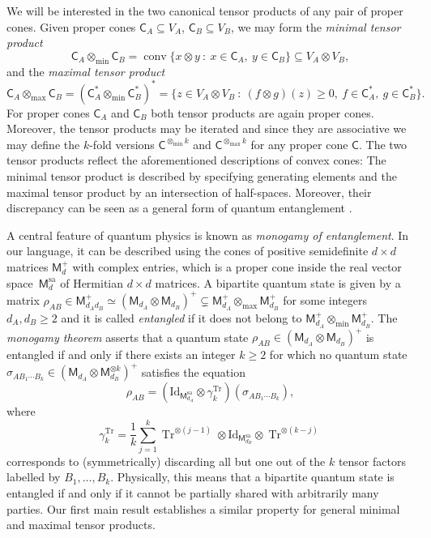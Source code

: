 \documentclass{amsart}
\renewcommand{\geq}{\geqslant}
\renewcommand{\subset}{\subseteq}
\newcommand{\gC}{\mathsf{C}}
\DeclareMathOperator{\conv}{\mathrm{conv}}
\newcommand{\M}{\mathsf{M}}
\newcommand{\Id}{\mathrm{Id}}
\def\lb{\left(}
\def\rb{\right)}
\def\lset{\lbrace}
\def\rset{\rbrace}
\DeclareMathOperator{\Tr}{Tr}
\theoremstyle{plain}
\newcommand{\tmin}{{\otimes_{\min}}}
\newcommand{\tmax}{{\otimes_{\max}}}
\begin{document}
We will be interested in the two canonical tensor products of any pair of proper cones. Given proper cones $\gC_A\subset V_A$, $\gC_B\subset V_B$, we may form the \emph{minimal tensor product}
\[
\gC_A \tmin \gC_B = \conv\lset x\otimes y~:~x\in \gC_A,\ y\in \gC_B\rset\subset V_A\otimes V_B ,
\]
and the \emph{maximal tensor product} 
\[
\gC_A \tmax \gC_B = (\gC^*_A\tmin \gC^*_B)^* = \lset z\in V_A\otimes V_B~:~ (f\otimes g)(z)\geq 0,\ f\in \gC_A^*,\ g\in \gC_B^* \rset .
\]
For proper cones $\gC_A$ and $\gC_B$ both tensor products are again proper cones. Moreover, the tensor products may be iterated and since they are associative we may define the $k$-fold versions $\gC^{\otimes_{\min} k}$ and $\gC^{\otimes_{\max} k}$ for any proper cone $\gC$. The two tensor products reflect the aforementioned descriptions of convex cones: The minimal tensor product is described by specifying generating elements and the maximal tensor product by an intersection of half-spaces. Moreover, their discrepancy can be seen as a general form of quantum entanglement \cite{ALPP21}.

A central feature of quantum physics is known as \emph{monogamy of entanglement}. In our language, it can be described using the cones of positive semidefinite $d\times d$ matrices $\M^+_d$ with complex entries, which is a proper cone inside the real vector space~$\M_d^{\mathrm{sa}}$ of Hermitian $d\times d$ matrices. A bipartite quantum state is given by a matrix $\rho_{AB}\in \M_{d_Ad_B}^+ \simeq (\M_{d_A}\otimes \M_{d_B})^+ \subsetneq \M_{d_A}^+ \tmax \M_{d_B}^+$ for some integers ${d_A,d_B \geq 2}$ and it is called \emph{entangled} if it does not belong to $\M^+_{d_A}\otimes_{\min} \M^+_{d_B}$. The \emph{monogamy theorem} \cite{DPS04, Yang06} asserts that a quantum state $\rho_{AB}\in (\M_{d_A}\otimes \M_{d_B})^+$ is entangled if and only if there exists an integer $k \geq 2$ for which no quantum state $\sigma_{AB_1\cdots B_k}\in (\M_{d_A}\otimes \M^{\otimes k}_{d_B})^+$ satisfies the equation
\[
\rho_{AB} = \lb\Id_{\displaystyle \M^{\mathrm{sa}}_{d_A}}\otimes \gamma^{\Tr}_k\rb\lb \sigma_{AB_1\cdots B_k}\rb ,
\]
where
\[
\gamma^{\Tr}_k = \frac{1}{k} \sum_{j=1}^k \Tr^{\otimes (j-1)} \otimes \Id_{\displaystyle \M^{\mathrm{sa}}_{d_B}} \otimes \Tr^{\otimes (k-j)}
\]
corresponds to (symmetrically) discarding all but one out of the $k$ tensor factors labelled by $B_1,\ldots, B_k$. Physically, this means that a bipartite quantum state is entangled if and only if it cannot be partially shared with arbitrarily many parties. Our first main result establishes a similar property for general minimal and maximal tensor products.
\end{document}
